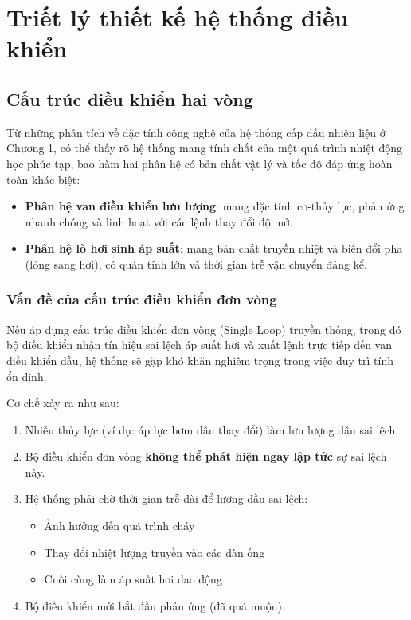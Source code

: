 \documentclass[../main.tex]{subfiles}
\begin{document}
\section{Triết lý thiết kế hệ thống điều khiển}

\subsection{Cấu trúc điều khiển hai vòng}

Từ những phân tích về đặc tính công nghệ của hệ thống cấp dầu nhiên liệu ở Chương 1, có thể thấy rõ hệ thống mang tính chất của một quá trình nhiệt động học phức tạp, bao hàm hai phân hệ có bản chất vật lý và tốc độ đáp ứng hoàn toàn khác biệt:
\begin{itemize}
    \item \textbf{Phân hệ van điều khiển lưu lượng}: mang đặc tính cơ-thủy lực, phản ứng nhanh chóng và linh hoạt với các lệnh thay đổi độ mở.
    \item \textbf{Phân hệ lò hơi sinh áp suất}: mang bản chất truyền nhiệt và biến đổi pha (lỏng sang hơi), có quán tính lớn và thời gian trễ vận chuyển đáng kể.
\end{itemize}

\subsubsection{Vấn đề của cấu trúc điều khiển đơn vòng}

Nếu áp dụng cấu trúc điều khiển đơn vòng (Single Loop) truyền thống, trong đó bộ điều khiển nhận tín hiệu sai lệch áp suất hơi và xuất lệnh trực tiếp đến van điều khiển dầu, hệ thống sẽ gặp khó khăn nghiêm trọng trong việc duy trì tính ổn định.

Cơ chế xảy ra như sau:
\begin{enumerate}
    \item Nhiễu thủy lực (ví dụ: áp lực bơm dầu thay đổi) làm lưu lượng dầu sai lệch.
    \item Bộ điều khiển đơn vòng \textbf{không thể phát hiện ngay lập tức} sự sai lệch này.
    \item Hệ thống phải chờ thời gian trễ dài để lượng dầu sai lệch:
    \begin{itemize}
        \item[\ding{212}] Ảnh hưởng đến quá trình cháy
        \item[\ding{212}] Thay đổi nhiệt lượng truyền vào các dàn ống
        \item[\ding{212}] Cuối cùng làm áp suất hơi dao động
    \end{itemize}
    \item Bộ điều khiển mới bắt đầu phản ứng (đã quá muộn).
\end{enumerate}
\end{document}
